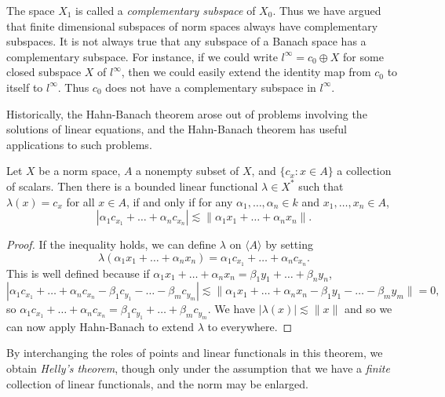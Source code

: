 The space $X_1$ is called a \emph{complementary subspace} of $X_0$. Thus we have argued that finite dimensional subspaces of norm spaces always have complementary subspaces. It is not always true that any subspace of a Banach space has a complementary subspace. For instance, if we could write $l^\infty = c_0 \oplus X$ for some closed subspace $X$ of $l^\infty$, then we could easily extend the identity map from $c_0$ to itself to $l^\infty$. Thus $c_0$ does not have a complementary subspace in $l^\infty$.

Historically, the Hahn-Banach theorem arose out of problems involving the solutions of linear equations, and the Hahn-Banach theorem has useful applications to such problems.

\begin{theorem}
    Let $X$ be a norm space, $A$ a nonempty subset of $X$, and $\{ c_x : x \in A \}$ a collection of scalars. Then there is a bounded linear functional $\lambda \in X^*$ such that $\lambda(x) = c_x$ for all $x \in A$, if and only if for any $\alpha_1,\dots,\alpha_n \in k$ and $x_1, \dots, x_n \in A$,
    \[ |\alpha_1 c_{x_1} + \dots + \alpha_n c_{x_n}| \lesssim \| \alpha_1 x_1 + \dots + \alpha_n x_n \|. \]
\end{theorem}
\begin{proof}
    If the inequality holds, we can define $\lambda$ on $\langle A \rangle$ by setting
    \[ \lambda(\alpha_1 x_1 + \dots + \alpha_n x_n) = \alpha_1 c_{x_1} + \dots + \alpha_n c_{x_n}. \]
    This is well defined because if $\alpha_1 x_1 + \dots + \alpha_n x_n = \beta_1 y_1 + \dots + \beta_n y_n$,
    \[ |\alpha_1 c_{x_1} + \dots + \alpha_n c_{x_n} - \beta_1 c_{y_1} - \dots - \beta_m c_{y_m} | \lesssim \| \alpha_1 x_1 + \dots + \alpha_n x_n - \beta_1 y_1 - \dots - \beta_m y_m \| = 0, \]
    so $\alpha_1 c_{x_1} + \dots + \alpha_n c_{x_n} = \beta_1 c_{y_1} + \dots + \beta_m c_{y_m}$. We have $|\lambda(x)| \lesssim \| x \|$ and so we can now apply Hahn-Banach to extend $\lambda$ to everywhere.
\end{proof}

By interchanging the roles of points and linear functionals in this theorem, we obtain \emph{Helly's theorem}, though only under the assumption that we have a \emph{finite} collection of linear functionals, and the norm may be enlarged.

